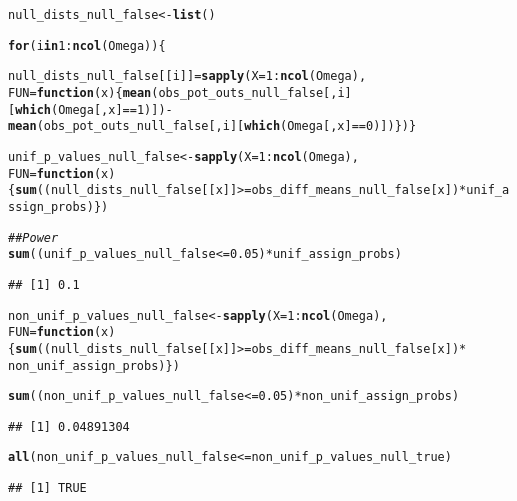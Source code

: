 \documentclass[11pt,leqno]{article}\usepackage[]{graphicx}\usepackage[]{color}
\makeatletter
\newcommand{\hlnum}[1]{\textcolor[rgb]{0.686,0.059,0.569}{#1}}%
\newcommand{\hlcom}[1]{\textcolor[rgb]{0.678,0.584,0.686}{\textit{#1}}}%
\newcommand{\hlopt}[1]{\textcolor[rgb]{0,0,0}{#1}}%
\newcommand{\hlstd}[1]{\textcolor[rgb]{0.345,0.345,0.345}{#1}}%
\newcommand{\hlkwa}[1]{\textcolor[rgb]{0.161,0.373,0.58}{\textbf{#1}}}%
\newcommand{\hlkwb}[1]{\textcolor[rgb]{0.69,0.353,0.396}{#1}}%
\newcommand{\hlkwc}[1]{\textcolor[rgb]{0.333,0.667,0.333}{#1}}%
\newcommand{\hlkwd}[1]{\textcolor[rgb]{0.737,0.353,0.396}{\textbf{#1}}}%
\newenvironment{kframe}{%
 \def\at@end@of@kframe{}%
 \ifinner\ifhmode%
  \def\at@end@of@kframe{\end{minipage}}%
  \begin{minipage}{\columnwidth}%
 \fi\fi%
 \def\FrameCommand##1{\hskip\@totalleftmargin \hskip-\fboxsep
 \colorbox{shadecolor}{##1}\hskip-\fboxsep
     \hskip-\linewidth \hskip-\@totalleftmargin \hskip\columnwidth}%
 \MakeFramed {\advance\hsize-\width
   \@totalleftmargin\z@ \linewidth\hsize
   \@setminipage}}%
 {\par\unskip\endMakeFramed%
 \at@end@of@kframe}
\newenvironment{knitrout}{}{} %
\theoremstyle{newstyle}
\makeatother
\begin{document}
\begin{knitrout}
\begin{kframe}
\begin{alltt}
\hlstd{null_dists_null_false} \hlkwb{<-} \hlkwd{list}\hlstd{()}

\hlkwa{for}\hlstd{(i} \hlkwa{in} \hlnum{1}\hlopt{:}\hlkwd{ncol}\hlstd{(Omega))\{}

  \hlstd{null_dists_null_false[[i]]} \hlkwb{=} \hlkwd{sapply}\hlstd{(}\hlkwc{X} \hlstd{=} \hlnum{1}\hlopt{:}\hlkwd{ncol}\hlstd{(Omega),}
                                      \hlkwc{FUN} \hlstd{=} \hlkwa{function}\hlstd{(}\hlkwc{x}\hlstd{) \{} \hlkwd{mean}\hlstd{(obs_pot_outs_null_false[,i][}\hlkwd{which}\hlstd{(Omega[,x]} \hlopt{==} \hlnum{1}\hlstd{)])} \hlopt{-}
                                          \hlkwd{mean}\hlstd{(obs_pot_outs_null_false[,i][}\hlkwd{which}\hlstd{(Omega[,x]} \hlopt{==} \hlnum{0}\hlstd{)]) \}) \}}

\hlstd{unif_p_values_null_false} \hlkwb{<-} \hlkwd{sapply}\hlstd{(}\hlkwc{X} \hlstd{=} \hlnum{1}\hlopt{:}\hlkwd{ncol}\hlstd{(Omega),}
                                   \hlkwc{FUN} \hlstd{=} \hlkwa{function}\hlstd{(}\hlkwc{x}\hlstd{) \{} \hlkwd{sum}\hlstd{((null_dists_null_false[[x]]} \hlopt{>=} \hlstd{obs_diff_means_null_false[x])} \hlopt{*} \hlstd{unif_assign_probs) \})}

\hlcom{## Power}
\hlkwd{sum}\hlstd{((unif_p_values_null_false} \hlopt{<=} \hlnum{0.05}\hlstd{)} \hlopt{*} \hlstd{unif_assign_probs)}
\end{alltt}
\begin{verbatim}
## [1] 0.1
\end{verbatim}
\begin{alltt}
\hlstd{non_unif_p_values_null_false} \hlkwb{<-} \hlkwd{sapply}\hlstd{(}\hlkwc{X} \hlstd{=} \hlnum{1}\hlopt{:}\hlkwd{ncol}\hlstd{(Omega),}
                                       \hlkwc{FUN} \hlstd{=} \hlkwa{function}\hlstd{(}\hlkwc{x}\hlstd{) \{} \hlkwd{sum}\hlstd{((null_dists_null_false[[x]]} \hlopt{>=} \hlstd{obs_diff_means_null_false[x])} \hlopt{*}
                                                                 \hlstd{non_unif_assign_probs) \})}

\hlkwd{sum}\hlstd{((non_unif_p_values_null_false} \hlopt{<=} \hlnum{0.05}\hlstd{)} \hlopt{*} \hlstd{non_unif_assign_probs)}
\end{alltt}
\begin{verbatim}
## [1] 0.04891304
\end{verbatim}
\begin{alltt}
\hlkwd{all}\hlstd{(non_unif_p_values_null_false} \hlopt{<=} \hlstd{non_unif_p_values_null_true)}
\end{alltt}
\begin{verbatim}
## [1] TRUE
\end{verbatim}
\end{kframe}
\end{knitrout}
\end{document}
